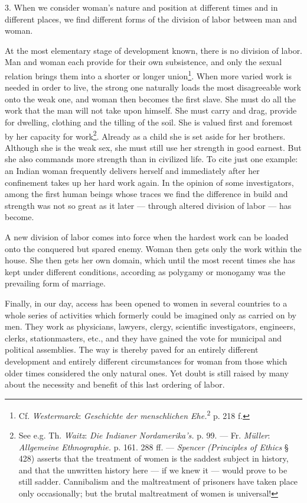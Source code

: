 \documentclass[12pt,a4paper,openany]{book}
\newcommand{\opage}[1]{\marginnote{\footnotesize\textit{[#1]}}}
\begin{document}
3. When we consider woman's nature and position at different times and in different places, we find different forms of
the division of labor between man and woman.

At the most elementary stage of development known, there is no division of labor. Man and woman each provide for their
own subsistence, and only the sexual relation brings them into a shorter or longer union\footnote[1]{Cf.
\emph{Westermarck}: \textit{Geschichte der menschlichen Ehe.}\textsuperscript{2} p. 218 f.}. When more varied work is
needed in order to live, the strong one naturally loads the most disagreeable work onto the weak one, and woman then
becomes the first slave. She must do all the work that the man will not take upon himself. She must carry and drag,
provide for dwelling, clothing and the tilling of the soil. She is valued first and foremost by her capacity for
work\footnote[2]{See e.g. Th. \emph{Waitz}: \textit{Die Indianer Nordamerika's.} p. 99. --- Fr. \emph{Müller}:
\textit{Allgemeine Ethnographie.} p. 161. 288 ff. --- \emph{Spencer} \textit{(Principles of Ethics} § 428) asserts that
the treatment of women is the saddest subject in history, and that the unwritten history here --- if we knew it --- would
prove to be still sadder. Cannibalism and the maltreatment of prisoners have taken place only occasionally; but the
brutal maltreatment of women is universal!}. Already as a child she is set aside for her brothers. Although she is the
weak sex, she must still use her strength in good earnest. But she also commands more strength than in civilized life.
To cite just one example: an Indian woman frequently delivers herself and immediately after her confinement takes up her
hard work again. In the opinion of some investigators, among the first human beings whose traces we find the difference
in build and strength was not
\opage{313}so great as it later --- through altered division of labor --- has become.

A new division of labor comes into force when the hardest work can be loaded onto the conquered but spared enemy. Woman
then gets only the work within the house. She then gets her own domain, which until the most recent times she has kept
under different conditions, according as polygamy or monogamy was the prevailing form of marriage.

Finally, in our day, access has been opened to women in several countries to a whole series of activities which formerly
could be imagined only as carried on by men. They work as physicians, lawyers, clergy, scientific investigators,
engineers, clerks, stationmasters, etc., and they have gained the vote for municipal and political assemblies. The way is
thereby paved for an entirely different development and entirely different circumstances for woman from those which
older times considered the only natural ones. Yet doubt is still raised by many about the necessity and benefit of this
last ordering of labor.
\end{document}
